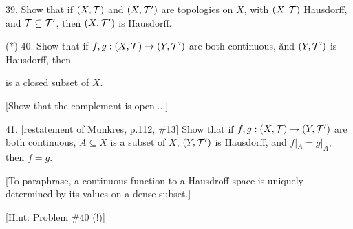 \documentclass[12]{article}
\begin{document}
\begin{description}
\msk

\item{39.} Show that if $(X,{\mathcal T})$ and $(X,{\mathcal T}^\prime)$ are
topologies on $X$, with $(X,{\mathcal T})$ Hausdorff, 
and ${\mathcal T}\subseteq{\mathcal T}^\prime$, then 
$(X,{\mathcal T}^\prime)$ is Hausdorff.

\msk


\item{(*)} 40. Show that if $f,g : (X,{\mathcal T})\rightarrow (Y,{\mathcal T}^\prime)$ are
both continuous, \u{and}  $(Y,{\mathcal T}^\prime)$ is Hausdorff, then

\ssk


is a closed subset of $X$.

\ssk

\item{\spc} [Show that the complement is open....]

\msk

\item{41.} [restatement of Munkres, p.112, \#13] Show that if $f,g:(X,{\mathcal T})\rightarrow(Y,{\mathcal T}^\prime)$
are both continuous, $A\subseteq X$ is a  subset of $X$, $(Y,{\mathcal T}^\prime)$
is Hausdorff, and $f|_A = g|_A$, then $f=g$. 

\ssk

\item{\spc} [To paraphrase, a continuous function to a Hausdroff space is uniquely 
determined by its values on a dense subset.]

\ssk

\item{\spc} [Hint: Problem \#40 (!)]


\end{description}
\vfill
\end{document}

